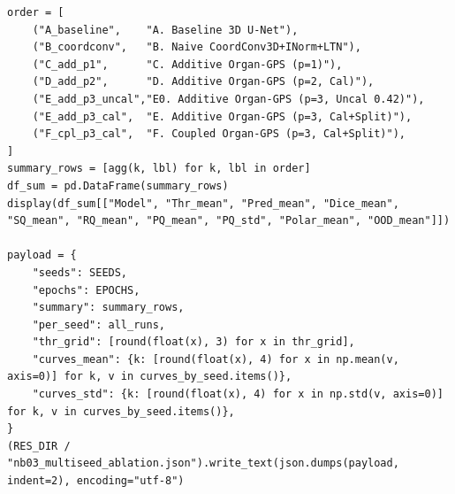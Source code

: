 \documentclass[10pt,a4paper]{article}
\renewcommand{\_}{\origunderscore\allowbreak}
\begin{document}
\begin{codebox}
\begin{lstlisting}[style=pybmed]
order = [
    ("A_baseline",    "A. Baseline 3D U-Net"),
    ("B_coordconv",   "B. Naive CoordConv3D+INorm+LTN"),
    ("C_add_p1",      "C. Additive Organ-GPS (p=1)"),
    ("D_add_p2",      "D. Additive Organ-GPS (p=2, Cal)"),
    ("E_add_p3_uncal","E0. Additive Organ-GPS (p=3, Uncal 0.42)"),
    ("E_add_p3_cal",  "E. Additive Organ-GPS (p=3, Cal+Split)"),
    ("F_cpl_p3_cal",  "F. Coupled Organ-GPS (p=3, Cal+Split)"),
]
summary_rows = [agg(k, lbl) for k, lbl in order]
df_sum = pd.DataFrame(summary_rows)
display(df_sum[["Model", "Thr_mean", "Pred_mean", "Dice_mean", "SQ_mean", "RQ_mean", "PQ_mean", "PQ_std", "Polar_mean", "OOD_mean"]])

payload = {
    "seeds": SEEDS,
    "epochs": EPOCHS,
    "summary": summary_rows,
    "per_seed": all_runs,
    "thr_grid": [round(float(x), 3) for x in thr_grid],
    "curves_mean": {k: [round(float(x), 4) for x in np.mean(v, axis=0)] for k, v in curves_by_seed.items()},
    "curves_std": {k: [round(float(x), 4) for x in np.std(v, axis=0)] for k, v in curves_by_seed.items()},
}
(RES_DIR / "nb03_multiseed_ablation.json").write_text(json.dumps(payload, indent=2), encoding="utf-8")
\end{lstlisting}
\end{codebox}
\end{document}
